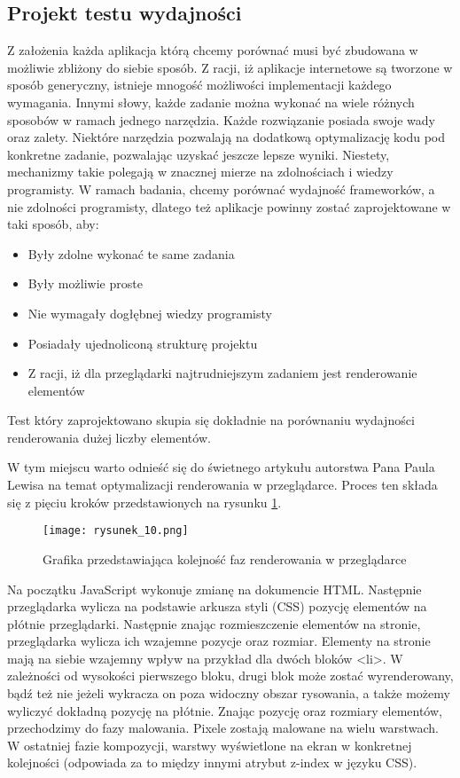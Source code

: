 \subsection{Projekt testu wydajności}
Z założenia każda aplikacja którą chcemy porównać musi być zbudowana w możliwie zbliżony do siebie sposób.
Z racji, iż aplikacje internetowe są tworzone w sposób generyczny, istnieje mnogość możliwości implementacji każdego wymagania.
Innymi słowy, każde zadanie można wykonać na wiele różnych sposobów w ramach jednego narzędzia.
Każde rozwiązanie posiada swoje wady oraz zalety. Niektóre narzędzia pozwalają na dodatkową optymalizację kodu pod konkretne zadanie, pozwalając uzyskać jeszcze lepsze wyniki.
Niestety, mechanizmy takie polegają w znacznej mierze na zdolnościach i wiedzy programisty.
W ramach badania, chcemy porównać wydajność frameworków, a nie zdolności programisty, dlatego też aplikacje powinny zostać zaprojektowane w taki sposób, aby:
\begin{itemize}
    \item Były zdolne wykonać te same zadania
    \item Były możliwie proste
    \item Nie wymagały dogłębnej wiedzy programisty
    \item Posiadały ujednoliconą strukturę projektu
    \item Z racji, iż dla przeglądarki najtrudniejszym zadaniem jest renderowanie elementów
\end{itemize}
Test który zaprojektowano skupia się dokładnie na porównaniu wydajności renderowania dużej liczby elementów.

W tym miejscu warto odnieść się do świetnego artykułu autorstwa Pana Paula Lewisa \cite{rendering-performance} na temat optymalizacji renderowania w przeglądarce. Proces ten składa się z pięciu kroków przedstawionych na rysunku \ref{fig:rysunek_10}. 

\begin{figure}[]
    \centering
    \texttt{[image: rysunek\_10.png]}
    \caption{Grafika przedstawiająca kolejność faz renderowania w przeglądarce \cite{rendering-performance}}
    \label{fig:rysunek_10}
\end{figure}

Na początku JavaScript wykonuje zmianę na dokumencie HTML.
Następnie przeglądarka wylicza na podstawie arkusza styli (CSS) pozycję elementów na płótnie przeglądarki.
Następnie znając rozmieszczenie elementów na stronie, przeglądarka wylicza ich wzajemne pozycje oraz rozmiar.
Elementy na stronie mają na siebie wzajemny wpływ na przykład dla dwóch bloków <li>.
W zależności od wysokości pierwszego bloku, drugi blok może zostać wyrenderowany, bądź też nie jeżeli wykracza on poza widoczny obszar rysowania, a także możemy wyliczyć dokładną pozycję na płótnie.
Znając pozycję oraz rozmiary elementów, przechodzimy do fazy malowania.
Pixele zostają malowane na wielu warstwach. W ostatniej fazie kompozycji, warstwy wyświetlone na ekran w konkretnej kolejności (odpowiada za to między innymi atrybut z-index w języku CSS).

